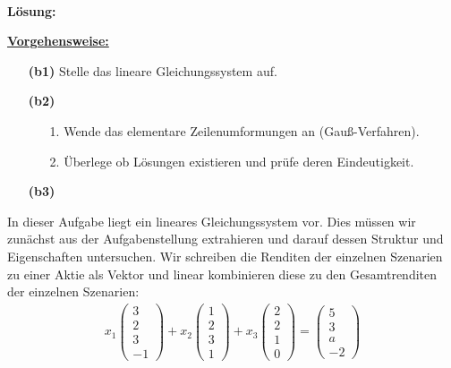 \ \\
\textbf{Lösung:}
\begin{mdframed}
\underline{\textbf{Vorgehensweise:}}
\renewcommand{\labelenumi}{\theenumi.}
\begin{enumerate}
\item[\textbf{(b1)}] Stelle das lineare Gleichungssystem auf.
\item[\textbf{(b2)}] 
\begin{enumerate}
	\item[1.] Wende das elementare Zeilenumformungen an (Gauß-Verfahren).
	\item[2.] Überlege ob Lösungen existieren und prüfe deren Eindeutigkeit.
\end{enumerate}

\item[\textbf{(b3)}] 
\end{enumerate}
\end{mdframed}

In dieser Aufgabe liegt ein lineares Gleichungssystem vor.
Dies müssen wir zunächst aus der Aufgabenstellung extrahieren und darauf dessen Struktur und Eigenschaften untersuchen.
Wir schreiben die Renditen der einzelnen Szenarien zu einer Aktie als Vektor und linear kombinieren diese zu den Gesamtrenditen der einzelnen Szenarien:
\begin{align*}
	x_1
	\begin{pmatrix}
		3 \\ 2 \\ 3 \\ -1
	\end{pmatrix}
	+
	x_2
	\begin{pmatrix}
		1 \\ 2 \\ 3 \\ 1
	\end{pmatrix}
	+
	x_3
	\begin{pmatrix}
		2 \\ 2 \\ 1 \\ 0
	\end{pmatrix}
	=
	\begin{pmatrix}
		5 \\ 3 \\ a \\ -2
	\end{pmatrix}
\end{align*}

